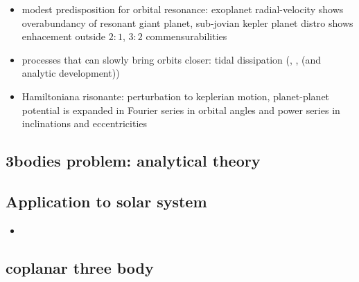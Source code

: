 \documentclass[main.tex]{subfiles}
\begin{document}
\begin{itemize}
\item modest predisposition for orbital resonance: exoplanet radial-velocity shows overabundancy of resonant giant planet, sub-jovian kepler planet distro shows enhacement outside $2:1$, $3:2$ commensurabilities
\item processes that can slowly bring orbits closer: tidal dissipation (\cite{goldreich1966q}, \cite{yoder1981tides}, \cite{peale1976orbital} (and analytic development))    
\item Hamiltoniana risonante: perturbation to keplerian motion, planet-planet potential is expanded in Fourier series in orbital angles and power series in inclinations and eccentricities
\end{itemize}

\subsection{3bodies problem: analytical theory}

\subsection{Application to solar system}
\begin{itemize}
    \item 
\end{itemize}
\subsection{coplanar three body}
\end{document}

